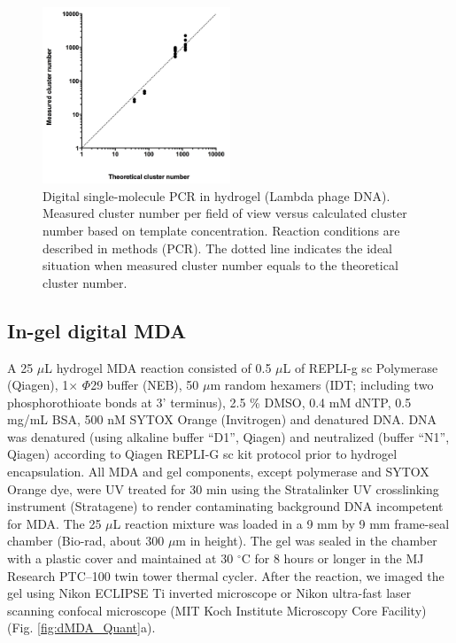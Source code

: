 \begin{figure}
\centering
\includegraphics[keepaspectratio,width=0.5\textwidth]{./figures/SuppFig3.jpg}
\caption[Digital single-molecule PCR in hydrogel (Lambda phage DNA).]{Digital single-molecule PCR in hydrogel (Lambda phage DNA). Measured cluster number per field of view versus calculated cluster number based on template concentration. Reaction conditions are described in methods (PCR). The dotted line indicates the ideal situation when measured cluster number equals to the theoretical cluster number.}
\label{fig:dPCR_Calibration}
\end{figure}

\subsection{In-gel digital MDA}
A 25 $\mu$L hydrogel MDA reaction consisted of 0.5 $\mu$L of REPLI-g sc Polymerase (Qiagen), 1$\times$ $\Phi$29 buffer (NEB), 50 $\mu$m random hexamers (IDT; including two phosphorothioate bonds at 3' terminus), 2.5 \% DMSO, 0.4 mM dNTP, 0.5 mg\slash mL BSA, 500 nM SYTOX Orange (Invitrogen) and denatured \textlambda DNA. \textlambda DNA was denatured (using alkaline buffer ``D1'', Qiagen) and neutralized (buffer ``N1'', Qiagen) according to Qiagen REPLI-G sc kit protocol prior to hydrogel encapsulation. All MDA and gel components, except polymerase and SYTOX Orange dye, were UV treated for 30 min using the Stratalinker UV crosslinking instrument (Stratagene) to render contaminating background DNA incompetent for MDA. The 25 $\mu$L reaction mixture was loaded in a 9 mm by 9 mm frame-seal chamber (Bio-rad, about 300 $\mu$m in height). The gel was sealed in the chamber with a plastic cover and maintained at 30 $^{\circ}$C for 8 hours or longer in the MJ Research PTC--100 twin tower thermal cycler. After the reaction, we imaged the gel using Nikon ECLIPSE Ti inverted microscope or Nikon ultra-fast laser scanning confocal microscope (MIT Koch Institute Microscopy Core Facility) (Fig. \ref{fig:dMDA_Quant}a).
